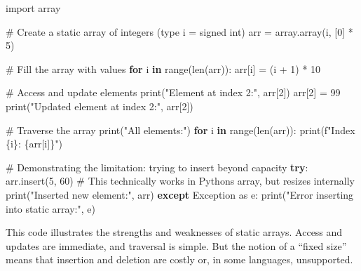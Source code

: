 \documentclass[
  letterpaper,
  DIV=11,
  numbers=noendperiod]{scrreprt}
\newenvironment{Shaded}{\begin{snugshade}}{\end{snugshade}}
\newcommand{\BuiltInTok}[1]{\textcolor[rgb]{0.00,0.23,0.31}{#1}}
\newcommand{\CommentTok}[1]{\textcolor[rgb]{0.37,0.37,0.37}{#1}}
\newcommand{\ControlFlowTok}[1]{\textcolor[rgb]{0.00,0.23,0.31}{\textbf{#1}}}
\newcommand{\DecValTok}[1]{\textcolor[rgb]{0.68,0.00,0.00}{#1}}
\newcommand{\ImportTok}[1]{\textcolor[rgb]{0.00,0.46,0.62}{#1}}
\newcommand{\KeywordTok}[1]{\textcolor[rgb]{0.00,0.23,0.31}{\textbf{#1}}}
\newcommand{\NormalTok}[1]{\textcolor[rgb]{0.00,0.23,0.31}{#1}}
\newcommand{\OperatorTok}[1]{\textcolor[rgb]{0.37,0.37,0.37}{#1}}
\newcommand{\PreprocessorTok}[1]{\textcolor[rgb]{0.68,0.00,0.00}{#1}}
\newcommand{\SpecialCharTok}[1]{\textcolor[rgb]{0.37,0.37,0.37}{#1}}
\newcommand{\SpecialStringTok}[1]{\textcolor[rgb]{0.13,0.47,0.30}{#1}}
\newcommand{\StringTok}[1]{\textcolor[rgb]{0.13,0.47,0.30}{#1}}
\begin{document}
\begin{Shaded}
\begin{Highlighting}[]
\ImportTok{import}\NormalTok{ array}

\CommentTok{\# Create a static array of integers (type \textquotesingle{}i\textquotesingle{} = signed int)}
\NormalTok{arr }\OperatorTok{=}\NormalTok{ array.array(}\StringTok{\textquotesingle{}i\textquotesingle{}}\NormalTok{, [}\DecValTok{0}\NormalTok{] }\OperatorTok{*} \DecValTok{5}\NormalTok{)}

\CommentTok{\# Fill the array with values}
\ControlFlowTok{for}\NormalTok{ i }\KeywordTok{in} \BuiltInTok{range}\NormalTok{(}\BuiltInTok{len}\NormalTok{(arr)):}
\NormalTok{    arr[i] }\OperatorTok{=}\NormalTok{ (i }\OperatorTok{+} \DecValTok{1}\NormalTok{) }\OperatorTok{*} \DecValTok{10}

\CommentTok{\# Access and update elements}
\BuiltInTok{print}\NormalTok{(}\StringTok{"Element at index 2:"}\NormalTok{, arr[}\DecValTok{2}\NormalTok{])}
\NormalTok{arr[}\DecValTok{2}\NormalTok{] }\OperatorTok{=} \DecValTok{99}
\BuiltInTok{print}\NormalTok{(}\StringTok{"Updated element at index 2:"}\NormalTok{, arr[}\DecValTok{2}\NormalTok{])}

\CommentTok{\# Traverse the array}
\BuiltInTok{print}\NormalTok{(}\StringTok{"All elements:"}\NormalTok{)}
\ControlFlowTok{for}\NormalTok{ i }\KeywordTok{in} \BuiltInTok{range}\NormalTok{(}\BuiltInTok{len}\NormalTok{(arr)):}
    \BuiltInTok{print}\NormalTok{(}\SpecialStringTok{f"Index }\SpecialCharTok{\{}\NormalTok{i}\SpecialCharTok{\}}\SpecialStringTok{: }\SpecialCharTok{\{}\NormalTok{arr[i]}\SpecialCharTok{\}}\SpecialStringTok{"}\NormalTok{)}

\CommentTok{\# Demonstrating the limitation: trying to insert beyond capacity}
\ControlFlowTok{try}\NormalTok{:}
\NormalTok{    arr.insert(}\DecValTok{5}\NormalTok{, }\DecValTok{60}\NormalTok{)  }\CommentTok{\# This technically works in Python\textquotesingle{}s array, but resizes internally}
    \BuiltInTok{print}\NormalTok{(}\StringTok{"Inserted new element:"}\NormalTok{, arr)}
\ControlFlowTok{except} \PreprocessorTok{Exception} \ImportTok{as}\NormalTok{ e:}
    \BuiltInTok{print}\NormalTok{(}\StringTok{"Error inserting into static array:"}\NormalTok{, e)}
\end{Highlighting}
\end{Shaded}

This code illustrates the strengths and weaknesses of static arrays.
Access and updates are immediate, and traversal is simple. But the
notion of a ``fixed size'' means that insertion and deletion are costly
or, in some languages, unsupported.
\end{document}
